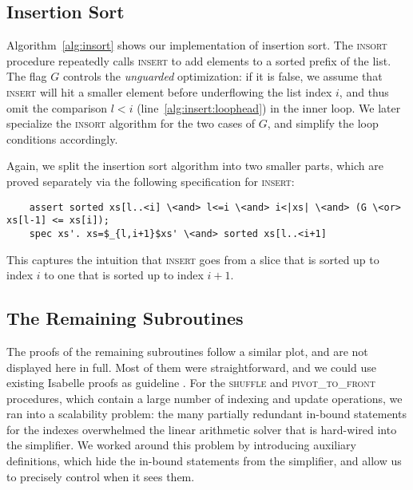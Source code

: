 \documentclass[runningheads]{llncs}
\begin{document}
  \subsection{Insertion Sort}\label{sec:insort}
  Algorithm~\ref{alg:insort} shows our implementation of insertion sort.
  The \textsc{insort} procedure repeatedly calls \textsc{insert} to add elements to a sorted prefix of the list.
  The flag $G$ controls the \emph{unguarded} optimization: if it is false, we assume that \textsc{insert} will hit a smaller
  element before underflowing the list index $i$, and thus omit the comparison $l<i$ (line~\ref{alg:insert:loophead}) in the inner loop.
  We later specialize the \textsc{insort} algorithm for the two cases of $G$, and simplify the loop conditions accordingly.



  Again, we split the insertion sort algorithm into two smaller parts, which are proved separately via the following
  specification for \textsc{insert}:
  \begin{lstlisting}
    assert sorted xs[l..<i] \<and> l<=i \<and> i<|xs| \<and> (G \<or> xs[l-1] <= xs[i]);
    spec xs'. xs=$_{l,i+1}$xs' \<and> sorted xs[l..<i+1]
  \end{lstlisting}
  This captures the intuition that \textsc{insert} goes from a slice that is sorted up to index $i$ to one that is sorted up to index $i+1$.

\subsection{The Remaining Subroutines}
  \newcommand{\leftc}{\textrm{left}}
  \newcommand{\rightc}{\textrm{right}}
  \newcommand{\hasleftc}{\textrm{has\_left}}
  \newcommand{\hasrightc}{\textrm{has\_right}}

  The proofs of the remaining subroutines follow a similar plot, and are not displayed here in full.
  Most of them were straightforward, and we could use existing Isabelle proofs as guideline \cite{LaWi19-IMP2,Gri19-AFP,La16}.
  For the \textsc{shuffle} and \textsc{pivot\_to\_front} procedures, which contain a large number of indexing and update operations,
  we ran into a scalability problem: the many partially redundant in-bound statements for
  the indexes overwhelmed the linear arithmetic solver that is hard-wired into the simplifier.
  We worked around this problem by introducing auxiliary definitions, which hide the in-bound statements from the simplifier,
  and allow us to precisely control when it sees them.
\end{document}
